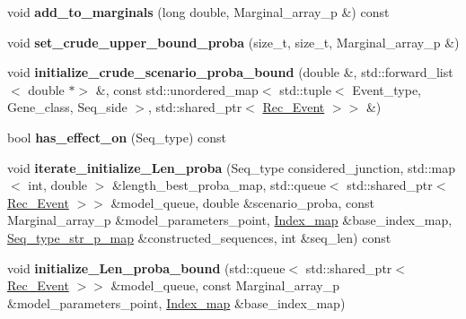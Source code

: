 \begin{DoxyCompactItemize}
\mbox{\label{classInsertion_a139905cff68908afdc55ee9fabafb191}} 
void {\bfseries add\+\_\+to\+\_\+marginals} (long double, Marginal\+\_\+array\+\_\+p \&) const
\item 
\mbox{\label{classInsertion_a5c38b8caabad0eda4f948410fd863a37}} 
void {\bfseries set\+\_\+crude\+\_\+upper\+\_\+bound\+\_\+proba} (size\+\_\+t, size\+\_\+t, Marginal\+\_\+array\+\_\+p \&)
\item 
\mbox{\label{classInsertion_aa23f4e5196c4993419f0dbe73142704c}} 
void {\bfseries initialize\+\_\+crude\+\_\+scenario\+\_\+proba\+\_\+bound} (double \&, std\+::forward\+\_\+list$<$ double $\ast$$>$ \&, const std\+::unordered\+\_\+map$<$ std\+::tuple$<$ Event\+\_\+type, Gene\+\_\+class, Seq\+\_\+side $>$, std\+::shared\+\_\+ptr$<$ \hyperlink{classRec__Event}{Rec\+\_\+\+Event} $>$$>$ \&)
\item 
\mbox{\label{classInsertion_ab050d5c2cc7a609c0ab519f9af7a3eca}} 
bool {\bfseries has\+\_\+effect\+\_\+on} (Seq\+\_\+type) const
\item 
\mbox{\label{classInsertion_a220705a85efcbca8085e31495d6cefdb}} 
void {\bfseries iterate\+\_\+initialize\+\_\+\+Len\+\_\+proba} (Seq\+\_\+type considered\+\_\+junction, std\+::map$<$ int, double $>$ \&length\+\_\+best\+\_\+proba\+\_\+map, std\+::queue$<$ std\+::shared\+\_\+ptr$<$ \hyperlink{classRec__Event}{Rec\+\_\+\+Event} $>$$>$ \&model\+\_\+queue, double \&scenario\+\_\+proba, const Marginal\+\_\+array\+\_\+p \&model\+\_\+parameters\+\_\+point, \hyperlink{classEnum__fast__memory__map}{Index\+\_\+map} \&base\+\_\+index\+\_\+map, \hyperlink{classEnum__fast__memory__map}{Seq\+\_\+type\+\_\+str\+\_\+p\+\_\+map} \&constructed\+\_\+sequences, int \&seq\+\_\+len) const
\item 
\mbox{\label{classInsertion_a3e0b4b03bdfe363c630f7b5012165650}} 
void {\bfseries initialize\+\_\+\+Len\+\_\+proba\+\_\+bound} (std\+::queue$<$ std\+::shared\+\_\+ptr$<$ \hyperlink{classRec__Event}{Rec\+\_\+\+Event} $>$$>$ \&model\+\_\+queue, const Marginal\+\_\+array\+\_\+p \&model\+\_\+parameters\+\_\+point, \hyperlink{classEnum__fast__memory__map}{Index\+\_\+map} \&base\+\_\+index\+\_\+map)
\end{DoxyCompactItemize}
